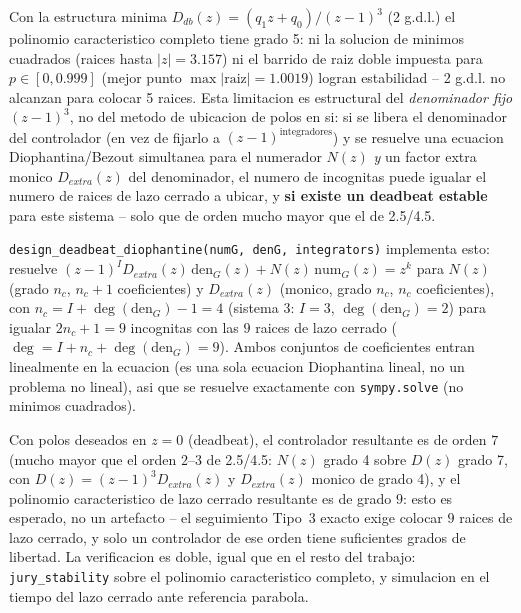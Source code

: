 \documentclass[11pt]{article}
\begin{document}
\begin{findingbox}
Con la estructura minima $D_{db}(z)=(q_1z+q_0)/(z-1)^3$ (2 g.d.l.) el
polinomio caracteristico completo tiene grado 5: ni la solucion de minimos
cuadrados (raices hasta $|z|=3.157$) ni el barrido de raiz doble impuesta
para $p\in[0,0.999]$ (mejor punto $\max|\text{raiz}|=1.0019$) logran
estabilidad -- 2 g.d.l. no alcanzan para colocar 5 raices. Esta limitacion es
estructural del \emph{denominador fijo} $(z-1)^3$, no del metodo de
ubicacion de polos en si: si se libera el denominador del controlador (en
vez de fijarlo a $(z-1)^{\text{integradores}}$) y se resuelve una ecuacion
Diophantina/Bezout simultanea para el numerador $N(z)$ \emph{y} un factor
extra monico $D_{extra}(z)$ del denominador, el numero de incognitas puede
igualar el numero de raices de lazo cerrado a ubicar, y \textbf{si existe un
deadbeat estable} para este sistema -- solo que de orden mucho mayor que el
de 2.5/4.5.

\texttt{design\_deadbeat\_diophantine(numG, denG, integrators)} implementa
esto: resuelve
$(z-1)^{I}D_{extra}(z)\,\mathrm{den}_G(z)+N(z)\,\mathrm{num}_G(z)=z^k$
para $N(z)$ (grado $n_c$, $n_c{+}1$ coeficientes) y $D_{extra}(z)$ (monico,
grado $n_c$, $n_c$ coeficientes), con $n_c=I+\deg(\mathrm{den}_G)-1=4$
(sistema 3: $I=3$, $\deg(\mathrm{den}_G)=2$) para igualar $2n_c{+}1=9$
incognitas con las $9$ raices de lazo cerrado ($\deg=I+n_c+\deg(\mathrm{den}_G)=9$).
Ambos conjuntos de coeficientes entran linealmente en la ecuacion (es una
sola ecuacion Diophantina lineal, no un problema no lineal), asi que se
resuelve exactamente con \texttt{sympy.solve} (no minimos cuadrados).
\end{findingbox}

Con polos deseados en $z=0$ (deadbeat), el controlador resultante es de
orden $7$ (mucho mayor que el orden $2$--$3$ de 2.5/4.5: $N(z)$ grado 4 sobre
$D(z)$ grado 7, con $D(z)=(z-1)^3D_{extra}(z)$ y $D_{extra}(z)$ monico de
grado 4), y el polinomio caracteristico de lazo cerrado resultante es de
grado $9$: esto es esperado, no un artefacto -- el seguimiento Tipo~3 exacto
exige colocar $9$ raices de lazo cerrado, y solo un controlador de ese orden
tiene suficientes grados de libertad. La verificacion es doble, igual que en
el resto del trabajo:
\texttt{jury\_stability} sobre el polinomio caracteristico completo, y
simulacion en el tiempo del lazo cerrado ante referencia parabola.
\end{document}
